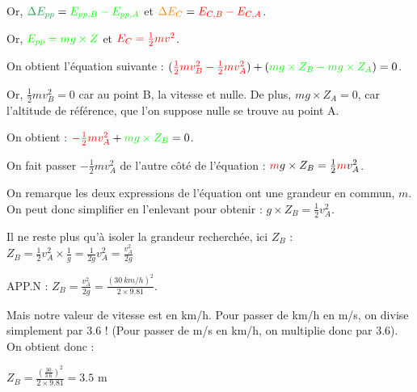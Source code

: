 \documentclass[a4paper,twoside,10pt,french]{scrartcl}
\begin{document}
Or, ${\color{ForestGreen}\Delta E_{pp}} = {\color{green}E_{pp, B} - E_{pp, A}}$ et ${\color{orange}\Delta E_C} = {\color{red}E_{C, B} - E_{C, A}}$.

Or, ${\color{green}E_{pp} = mg \times Z}$ et ${\color{red}E_{C} = \frac{1}{2}mv^2}$.

On obtient l'équation suivante : $({\color{red}\frac{1}{2}mv_B^2 - \frac{1}{2}mv_A^2}) + ({\color{green}mg \times Z_B - mg \times Z_A}) = 0$.

Or, $\frac{1}{2}mv_B^2 = 0$ car au point B, la vitesse et nulle. De plus, $mg \times Z_A = 0$, car l'altitude de référence, que l'on suppose nulle se trouve au point A.

On obtient : ${\color{red}-\frac{1}{2}mv_A^2} + {\color{green}mg \times Z_B} = 0$.

On fait passer $-\frac{1}{2}mv_A^2$ de l'autre côté de l'équation : ${\color{red}m}g \times Z_B = \frac{1}{2}{\color{red}m}v_A^2$.

On remarque les deux expressions de l'équation ont une grandeur en commun, $m$. On peut donc simplifier en l'enlevant pour obtenir : $g \times Z_B = \frac{1}{2}v_A^2$.

Il ne reste plus qu'à isoler la grandeur recherchée, ici $Z_B$ : $Z_B = \frac{1}{2}v_A^2 \times \frac{1}{g} = \frac{1}{2g}v_A^2 = \frac{v_A^2}{2g} $

APP.N : $Z_B = \frac{v_A^2}{2g} = \frac{(30 \:km/h)^2}{2 \times 9.81}$.

Mais notre valeur de vitesse est en km/h. Pour passer de km/h en m/s, on divise simplement par 3.6 ! (Pour passer de m/s en km/h, on multiplie donc par 3.6). On obtient donc :

$ Z_B = \frac{(\frac{30}{3.6})^2}{2 \times 9.81} = 3.5$\: m
\end{document}
